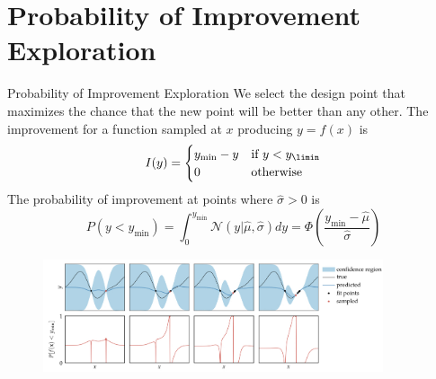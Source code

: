 \documentclass{beamer}
\begin{document}
\section{Probability of Improvement Exploration}
\begin{frame}{Probability of Improvement Exploration}
We select the design point that maximizes the chance that the new point will be better than any other. The improvement for a function sampled at $x$ producing $y=f(x)$ is
\begin{equation*}
    I(y) = 
    \begin{cases}
    y_{\min} - y & \textrm{if~} y<y_{\limin}\\
    0 & {\textrm{otherwise}}\\
    \end{cases}
\end{equation*}
The probability of improvement at points where $\hat{\sigma}>0$ is
\begin{equation*}
P(y<y_{\min}) = \int_0^{y_{\min}} \mathcal{N}(y| \hat{\mu}, \hat{\sigma})dy = \Phi(\frac{y_{\min}-\hat{\mu}}{\hat{\sigma}})
\end{equation*}

\begin{figure}
\centering
\includegraphics[width=100mm]{Figs/prob.jpeg}
\end{figure} 

\end{frame}
\end{document}
